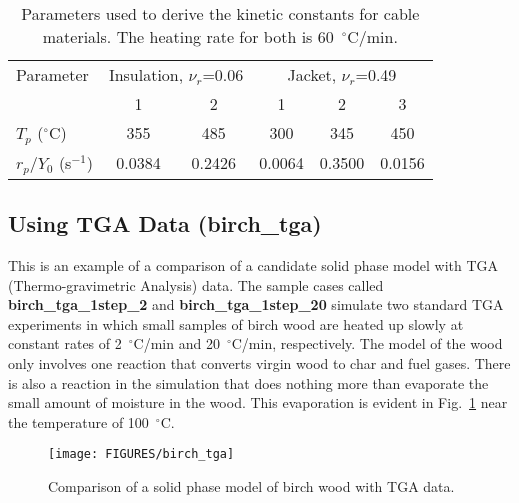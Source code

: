 \documentclass[11pt]{book}
\begin{document}
\begin{table}[ht]
\begin{center}
\caption{Parameters used to derive the kinetic constants for cable materials. The heating rate for both is
60~$^\circ$C/min.}
\label{cable_parameters}
\begin{tabular}{|l||c|c||c|c|c|}
\hline
Parameter               & \multicolumn{2}{|c|}{Insulation, $\nu_r$=0.06 }  &  \multicolumn{3}{|c|}{Jacket, $\nu_r$=0.49} \\ \cline{2-6}
                        & 1             & 2                 &  1        & 2         & 3              \\ \hline \hline
$T_p$ ($^\circ$C)       & 355           & 485               &  300      & 345       & 450            \\ \hline
$r_p/Y_0$ (s$^{-1}$)    & 0.0384        & 0.2426            &  0.0064   & 0.3500    & 0.0156         \\ \hline
\end{tabular}
\end{center}
\end{table}


\subsection{Using TGA Data (\texorpdfstring{{\bf birch\_tga}}{birch\_tga})}
\label{birch_tga}

This is an example of a comparison of a candidate solid phase model with TGA (Thermo-gravimetric Analysis) data. The sample cases
called {\bf birch\_tga\_1step\_2} and {\bf birch\_tga\_1step\_20} simulate two standard TGA experiments in which small samples of birch wood are heated up slowly at constant
rates of 2~$^\circ$C/min and 20~$^\circ$C/min, respectively. The model of the wood only involves one reaction that converts virgin wood to char and fuel gases. There is
also a reaction in the simulation that does nothing more than evaporate the small amount of moisture in the wood. This evaporation is evident in
Fig.~\ref{fig_birch_tga} near the temperature of 100~$^\circ$C.

\begin{figure}[ht]
   \begin{center}
      \texttt{[image: FIGURES/birch\_tga]}
      \caption[An example of TGA data.]{\label{fig_birch_tga}
    Comparison of a solid phase model of birch wood with TGA data.}
   \end{center}
   \end{figure}
\end{document}
